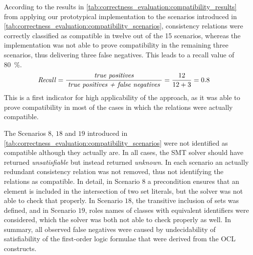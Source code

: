 According to the results in \autoref{tab:correctness_evaluation:compatibility_results} from applying our prototypical implementation to the scenarios introduced in \autoref{tab:correctness_evaluation:compatibility_scenarios}, consistency relations were correctly classified as compatible in twelve out of the 15 scenarios, whereas the implementation was not able to prove compatibility in the remaining three scenarios, thus delivering three false negatives.
This leads to a recall value of \SI{80}{\percent}.
\begin{align*}
    &
    \mathit{Recall} = \frac{\; \textit{true positives} \;}{\; \textit{true positives + false negatives} \;} = \frac{12}{12+3} = 0.8
\end{align*}
%
%
This is a first indicator for high applicability of the approach, as it was able to prove compatibility in most of the cases in which the relations were actually compatible.

The Scenarios $8$, $18$ and $19$ introduced in \autoref{tab:correctness_evaluation:compatibility_scenarios} were not identified as compatible although they actually are.
In all cases, the \gls{SMT} solver should have returned \emph{unsatisfiable} but instead returned \emph{unknown}.
In each scenario an actually redundant consistency relation was not removed, thus not identifying the relations as compatible.
In detail, in Scenario $8$ a precondition ensures that an element is included in the intersection of two set literals, but the solver was not able to check that properly.
In Scenario $18$, the transitive inclusion of sets was defined, and in Scenario $19$, roles names of classes with equivalent identifiers were considered, which the solver was both not able to check properly as well.
In summary, all observed false negatives were caused by undecidability of satisfiability of the first-order logic formulae that were derived from the \gls{OCL} constructs.

